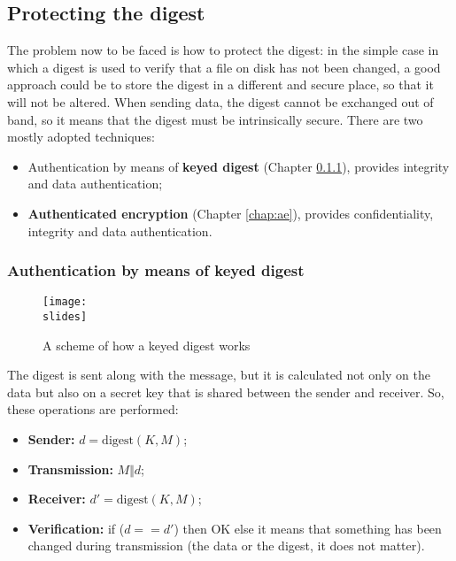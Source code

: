 \subsection{Protecting the digest}
The problem now to be faced is how to protect the digest: in the simple case in which a digest is used to verify
that a file on disk has not been changed, a good approach could be to store the digest in a different and secure
place, so that it will not be altered. When sending data, the digest cannot be exchanged out of band, so it means
that the digest must be intrinsically secure. There are two mostly adopted techniques:
\begin{itemize}
    \item Authentication by means of \textbf{keyed digest} (Chapter \ref{chap:keyed_digest}), provides integrity and data authentication;
    \item \textbf{Authenticated encryption} (Chapter \ref{chap:ae}), provides confidentiality, integrity and data authentication.
\end{itemize}

\subsubsection{Authentication by means of keyed digest}\label{chap:keyed_digest}
\begin{figure}[h]
    \centering
    \texttt{[image: \\slides]}
    \caption{A scheme of how a keyed digest works}
\end{figure}
The digest is sent along with the message, but it is calculated not only on the data but also on a secret key that is shared between the sender and receiver. So, these operations are performed:
\begin{itemize}
    \item \textbf{Sender:} \(d = \text{digest}(K, M)\);
    \item \textbf{Transmission:} \(M \Vert d\);
    \item \textbf{Receiver:} \(d' = \text{digest}(K, M)\);
    \item \textbf{Verification:} if (\(d == d'\)) then OK else it means that something has been changed during transmission (the data or the digest, it does not matter).
\end{itemize}

